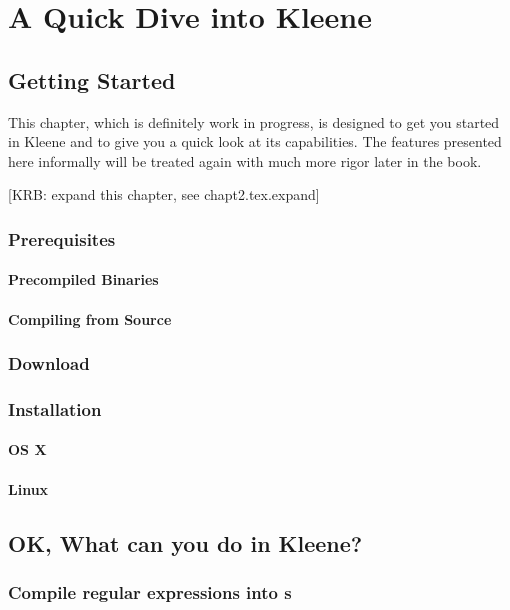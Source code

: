 \chapter{A Quick Dive into Kleene}

\section{Getting Started}

This chapter, which is definitely work in progress, is designed to get
you started in Kleene and to give you a quick look at its capabilities.
The features presented here informally will be treated again with much
more rigor later in the book.

[KRB: expand this chapter, see chapt2.tex.expand]

\subsection{Prerequisites}

\subsubsection{Precompiled Binaries}

\subsubsection{Compiling from Source}

\subsection{Download}

\subsection{Installation}

\subsubsection{OS X}

\subsubsection{Linux}

\section{OK, What can you do in Kleene?}

\subsection{Compile regular expressions into \fsm{}s}

